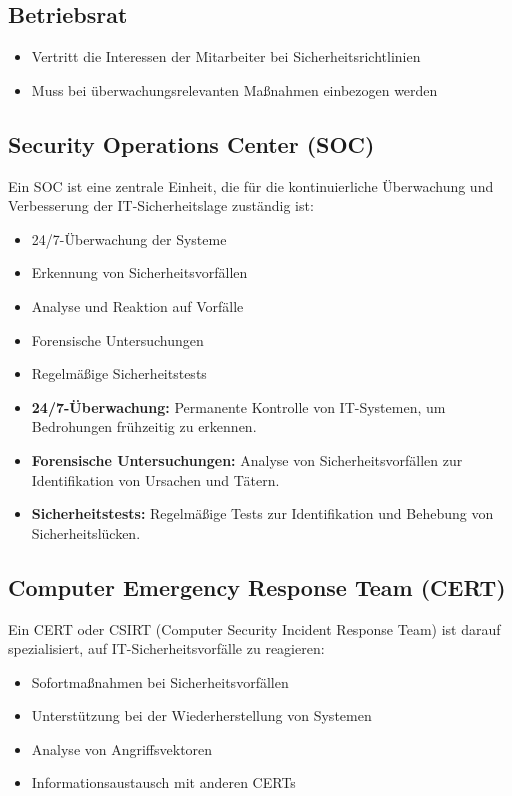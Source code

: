 \documentclass{orgstandard}
\begin{document}
\subsection{Betriebsrat}
\label{sec:org7564df2}
\begin{itemize}
\item Vertritt die Interessen der Mitarbeiter bei Sicherheitsrichtlinien
\item Muss bei überwachungsrelevanten Maßnahmen einbezogen werden
\end{itemize}
\subsection{Security Operations Center (SOC)}
\label{sec:org71fd933}
Ein SOC ist eine zentrale Einheit, die für die kontinuierliche Überwachung und Verbesserung der IT-Sicherheitslage zuständig ist:
\begin{itemize}
\item 24/7-Überwachung der Systeme
\item Erkennung von Sicherheitsvorfällen
\item Analyse und Reaktion auf Vorfälle
\item Forensische Untersuchungen
\item Regelmäßige Sicherheitstests
\end{itemize}

\begin{NOTES}
\begin{itemize}
\item \textbf{24/7-Überwachung:} Permanente Kontrolle von IT-Systemen, um Bedrohungen frühzeitig zu erkennen.
\item \textbf{Forensische Untersuchungen:} Analyse von Sicherheitsvorfällen zur Identifikation von Ursachen und Tätern.
\item \textbf{Sicherheitstests:} Regelmäßige Tests zur Identifikation und Behebung von Sicherheitslücken.
\end{itemize}
\end{NOTES}
\subsection{Computer Emergency Response Team (CERT)}
\label{sec:org943df01}
Ein CERT oder CSIRT (Computer Security Incident Response Team) ist darauf spezialisiert, auf IT-Sicherheitsvorfälle zu reagieren:
\begin{itemize}
\item Sofortmaßnahmen bei Sicherheitsvorfällen
\item Unterstützung bei der Wiederherstellung von Systemen
\item Analyse von Angriffsvektoren
\item Informationsaustausch mit anderen CERTs
\end{itemize}
\end{document}
